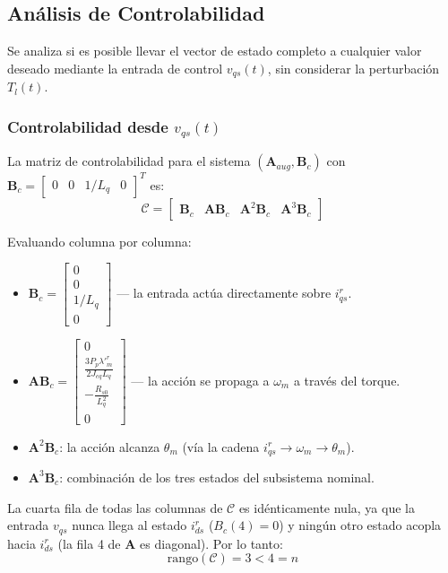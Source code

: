 \documentclass[12pt, a4paper,journal, onecolumn, compsoc]{IEEEtran}
\begin{document}
\subsection{Análisis de Controlabilidad}
Se analiza si es posible llevar el vector de estado completo a cualquier valor deseado mediante la entrada de control $v_{qs}(t)$, sin considerar la perturbación $T_l(t)$.

\subsubsection{Controlabilidad desde \texorpdfstring{$v_{qs}(t)$}{v_qs(t)}}
La matriz de controlabilidad para el sistema $(\mathbf{A}_{aug}, \mathbf{B}_c)$ con $\mathbf{B}_c = \begin{bmatrix} 0 & 0 & 1/L_q & 0 \end{bmatrix}^T$ es:
\begin{equation}
    \mathcal{C} = \begin{bmatrix} \mathbf{B}_c & \mathbf{A}\mathbf{B}_c & \mathbf{A}^2\mathbf{B}_c & \mathbf{A}^3\mathbf{B}_c \end{bmatrix}
\end{equation}

Evaluando columna por columna:
\begin{itemize}
    \item $\mathbf{B}_c = \begin{bmatrix} 0 \\ 0 \\ 1/L_q \\ 0 \end{bmatrix}$ --- la entrada actúa directamente sobre $i_{qs}^r$.
    \item $\mathbf{A}\mathbf{B}_c = \begin{bmatrix} 0 \\ \frac{3P_p\lambda'^r_m}{2J_{eq}L_q} \\ -\frac{R_{s0}}{L_q^2} \\ 0 \end{bmatrix}$ --- la acción se propaga a $\omega_m$ a través del torque.
    \item $\mathbf{A}^2\mathbf{B}_c$: la acción alcanza $\theta_m$ (vía la cadena $i_{qs}^r \to \omega_m \to \theta_m$).
    \item $\mathbf{A}^3\mathbf{B}_c$: combinación de los tres estados del subsistema nominal.
\end{itemize}

La cuarta fila de todas las columnas de $\mathcal{C}$ es idénticamente nula, ya que la entrada $v_{qs}$ nunca llega al estado $i_{ds}^r$ ($B_c(4) = 0$) y ningún otro estado acopla hacia $i_{ds}^r$ (la fila 4 de $\mathbf{A}$ es diagonal). Por lo tanto:
\begin{equation}
    \text{rango}(\mathcal{C}) = 3 < 4 = n
\end{equation}
\end{document}
